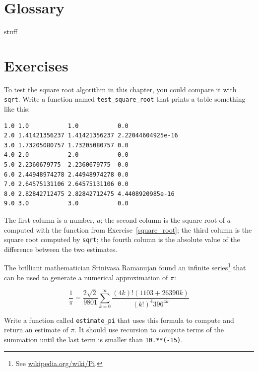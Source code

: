 \documentclass[10pt]{book}
\begin{document}
\section{Glossary}

\begin{description}
\item stuff

\end{description}


\section{Exercises}

\begin{ex}


To test the square root algorithm in this chapter, you could compare
it with {\tt sqrt}.  Write a function named \verb"test_square_root"
that prints a table something like this:

\beforeverb
\begin{verbatim}
1.0 1.0           1.0           0.0
2.0 1.41421356237 1.41421356237 2.22044604925e-16
3.0 1.73205080757 1.73205080757 0.0
4.0 2.0           2.0           0.0
5.0 2.2360679775  2.2360679775  0.0
6.0 2.44948974278 2.44948974278 0.0
7.0 2.64575131106 2.64575131106 0.0
8.0 2.82842712475 2.82842712475 4.4408920985e-16
9.0 3.0           3.0           0.0

\end{verbatim}
\afterverb
%
The first column is a number, $a$; the second column is
the square root of $a$ computed with the function from
Exercise~\ref{square_root}; the third column is the square root computed
by {\tt sqrt}; the fourth column is the absolute value
of the difference between the two estimates.
\end{ex}

\begin{ex}


The brilliant mathematician Srinivasa Ramanujan found an
infinite series\footnote{See \url{wikipedia.org/wiki/Pi}.}
that can be used to generate a numerical
approximation of $\pi$:


\[\frac{1}{\pi} = \frac{2\sqrt{2}}{9801} 
\sum^\infty_{k=0} \frac{(4k)!(1103+26390k)}{(k!)^4 396^{4k}} \]

Write a function called \verb"estimate_pi" that uses this formula
to compute and return an estimate of $\pi$.  It should use recursion 
to compute terms of the summation until the last term is
smaller than {\tt 10.**(-15)}.
\end{ex}
\end{document}
